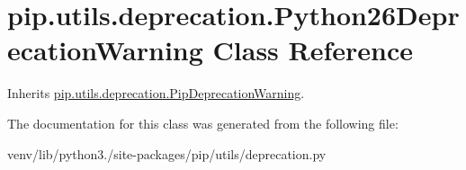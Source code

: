 \hypertarget{classpip_1_1utils_1_1deprecation_1_1_python26_deprecation_warning}{}\section{pip.\+utils.\+deprecation.\+Python26\+Deprecation\+Warning Class Reference}
\label{classpip_1_1utils_1_1deprecation_1_1_python26_deprecation_warning}


Inherits \hyperlink{classpip_1_1utils_1_1deprecation_1_1_pip_deprecation_warning}{pip.\+utils.\+deprecation.\+Pip\+Deprecation\+Warning}.



The documentation for this class was generated from the following file\+:\begin{DoxyCompactItemize}
\item 
venv/lib/python3./site-\/packages/pip/utils/deprecation.\+py\end{DoxyCompactItemize}
